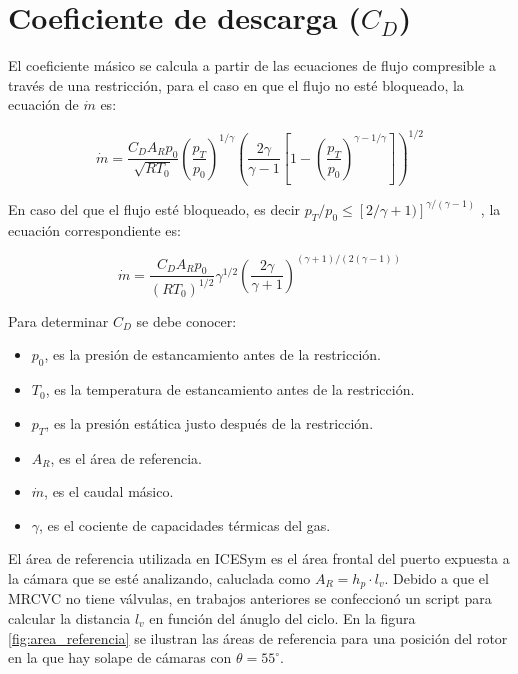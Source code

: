 \section{Coeficiente de descarga ($C_D$)}

El coeficiente másico se calcula a partir de las ecuaciones de flujo
compresible a través de una restricción, para el caso en que el flujo no esté
bloqueado, la ecuación de $\dot{m}$ es:

\begin{equation}
    \label{eq:m_not_choked}
    \dot{m} = \frac{C_D A_R p_0}{\sqrt{R T_0}}
            {\left(\frac{p_T}{p_0} \right)}^{1/\gamma}
            {\left( \frac{2\gamma}{\gamma-1} \left[1- {(\frac{p_T}{p_0})}^{{\gamma-1}/\gamma} \right] \right)} ^{1/2}
\end{equation}

En caso del que el flujo esté bloqueado, es decir
$p_T/p_0 \le [2/\gamma+1)]^{\gamma/(\gamma - 1)}$
, la ecuación correspondiente es:

\begin{equation}
    \dot{m}=  \frac {C_D A_R p_0} {(R T_0)^{1/2}}
            \gamma^{1/2}
            \left( \frac{2\gamma}{\gamma+1} \right)^{(\gamma+1)/(2(\gamma-1))}
\end{equation}

Para determinar $C_D$ se debe conocer:

\begin{itemize}
    \item $p_0$, es la presión de estancamiento antes de la restricción.
    \item $T_0$, es la temperatura de estancamiento antes de la restricción.
    \item $p_T$, es la presión estática justo después de la restricción.
    \item $A_R$, es el área de referencia.
    \item $\dot{m}$, es el caudal másico.
    \item $\gamma$, es el cociente de capacidades térmicas del gas.
\end{itemize}

El área de referencia utilizada en ICESym es el área frontal del puerto expuesta
a la cámara que se esté analizando, caluclada como $A_{R} = h_{p} \cdot l_{{v}}$.
%
Debido a que el MRCVC no tiene válvulas, en trabajos anteriores se confeccionó
un script para calcular la distancia $l_v$ en función del ánuglo del ciclo.
%
En la figura \ref{fig:area_referencia} se ilustran las áreas de referencia para
una posición del rotor en la que hay solape de cámaras con $\theta = 55^\circ$.

